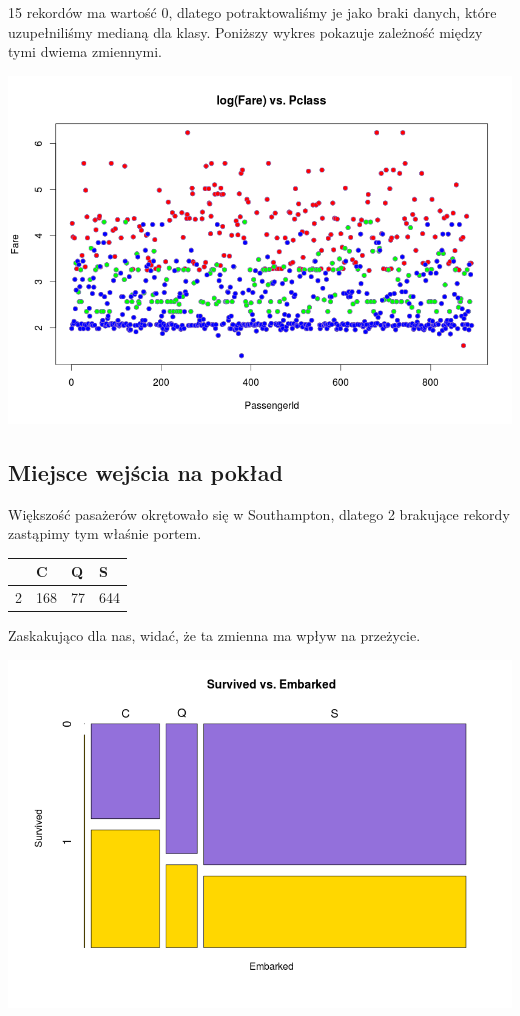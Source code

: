 \documentclass{article}
\begin{document}
15 rekordów ma wartość 0, dlatego potraktowaliśmy je jako braki danych, które uzupełniliśmy medianą dla klasy. Poniższy wykres pokazuje zależność między tymi dwiema zmiennymi.
\begin{center}
\includegraphics[scale=0.40]{images/logfare-vs-pclass.png}
\end{center}

\subsection{Miejsce wejścia na pokład }

Większość pasażerów okrętowało się w Southampton, dlatego 2 brakujące rekordy zastąpimy tym właśnie portem.
\begin{center}
    \begin{tabular}{| l | l | l | l |}
    \hline
        &  C &  Q &  S  \\ \hline
      2 & 168 & 77 & 644  \\
    \hline
    \end{tabular}
\end{center}

Zaskakująco dla nas, widać, że ta zmienna ma wpływ na przeżycie.

\includegraphics[scale=0.40]{images/survived-vs-embarked.png}
\end{document}
